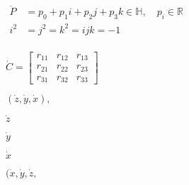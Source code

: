 \documentclass{article}
\begin{document}
$\boxed{\begin{aligned}\dot{P} &= p_0 + p_1 i + p_2 j + p_3 k \in \mathbb{H}, \quad p_i \in \mathbb{R} \\ i^2 &= j^2=k^2 = ijk = -1 \\ \end{aligned}}$
\pagebreak

$\boxed{\dot{C} = \begin{bmatrix} r_{11} & r_{12} & r_{13} \\ r_{21} & r_{22} & r_{23} \\ r_{31} & r_{32} & r_{33} \end{bmatrix}}$
\pagebreak

$\boxed{(\dot{z}, \dot{y}, \dot{x} ),}$
\pagebreak

$\dot{z}$
\pagebreak

$\dot{y}$
\pagebreak

$\dot{x}$
\pagebreak

$\boxed{(\dot{x}, \dot{y}, \dot{z},}$
\pagebreak
\end{document}
